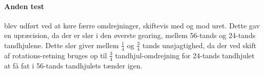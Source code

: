 \paragraph{Anden test} blev udført ved at køre færre omdrejninger, skiftevis med og mod uret.
Dette gav en upræcision, da der er slør i den øverste gearing, mellem 56-tands og 24-tands tandhjulene.
Dette slør giver mellem $\frac{1}{4}$ og $\frac{3}{4}$ tands unøjagtighed, da der ved skift af rotations-retning bruges op til $\frac{3}{4}$ tandhjul-omdrejning for 24-tands tandhjulet at få fat i 56-tands tandhjulets tænder igen.
